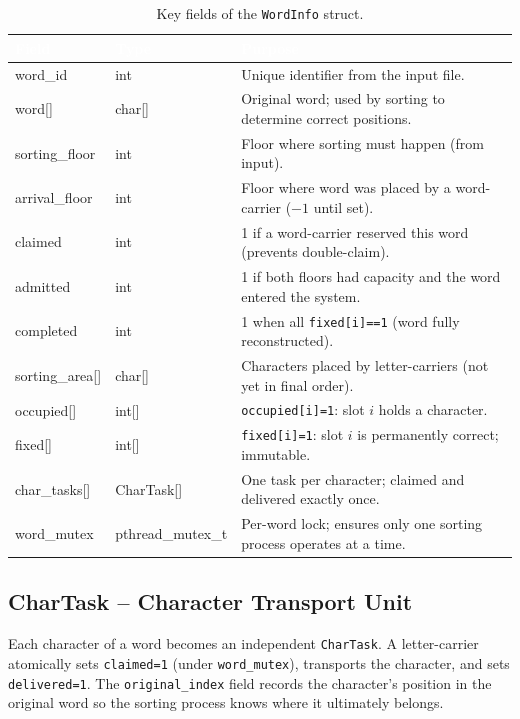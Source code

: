 \documentclass[12pt,a4paper]{article}
\newcommand{\code}[1]{\texttt{\small #1}}
\begin{document}
\begin{table}[htbp]
\centering
\caption{Key fields of the \texttt{WordInfo} struct.}
\begin{tabularx}{\textwidth}{>{\ttfamily}l >{\ttfamily}l X}
\toprule
\rowcolor{darkblue}
\textcolor{white}{Field} &
\textcolor{white}{Type} &
\textcolor{white}{Purpose} \\
\midrule
word\_id        & int          & Unique identifier from the input file. \\
\rowcolor{rowgray}
word[]          & char[]       & Original word; used by sorting to determine correct positions. \\
sorting\_floor  & int          & Floor where sorting must happen (from input). \\
\rowcolor{rowgray}
arrival\_floor  & int          & Floor where word was placed by a word-carrier ($-1$ until set). \\
claimed         & int          & 1 if a word-carrier reserved this word (prevents double-claim). \\
\rowcolor{rowgray}
admitted        & int          & 1 if both floors had capacity and the word entered the system. \\
completed       & int          & 1 when all \texttt{fixed[i]==1} (word fully reconstructed). \\
\rowcolor{rowgray}
sorting\_area[] & char[]       & Characters placed by letter-carriers (not yet in final order). \\
occupied[]      & int[]        & \texttt{occupied[i]=1}: slot $i$ holds a character. \\
\rowcolor{rowgray}
fixed[]         & int[]        & \texttt{fixed[i]=1}: slot $i$ is permanently correct; immutable. \\
char\_tasks[]   & CharTask[]   & One task per character; claimed and delivered exactly once. \\
\rowcolor{rowgray}
word\_mutex     & pthread\_mutex\_t & Per-word lock; ensures only one sorting process operates at a time. \\
\bottomrule
\end{tabularx}
\end{table}

\subsection{CharTask -- Character Transport Unit}

Each character of a word becomes an independent \code{CharTask}. A letter-carrier
atomically sets \code{claimed=1} (under \code{word\_mutex}), transports the character,
and sets \code{delivered=1}. The \code{original\_index} field records the character's
position in the original word so the sorting process knows where it ultimately belongs.
\end{document}
